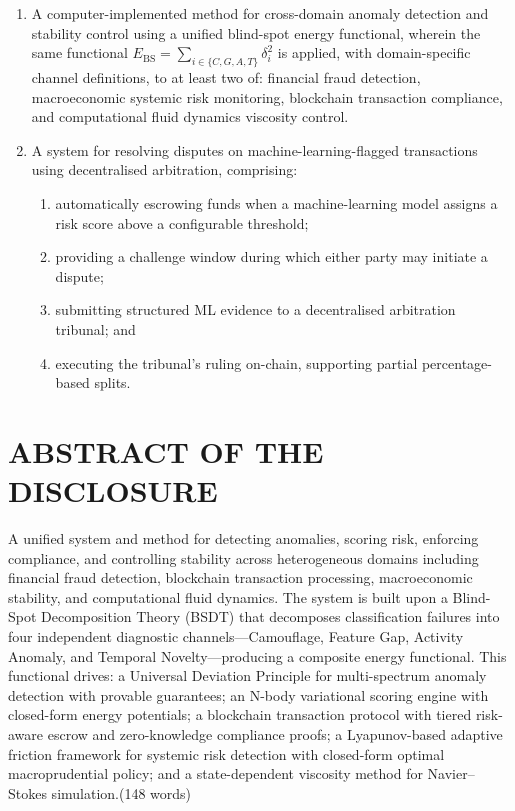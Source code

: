 \documentclass[12pt,a4paper]{article}
\begin{document}
\begin{enumerate}[label=\textbf{\arabic*.}, leftmargin=2em]
\item A computer-implemented method for cross-domain anomaly detection and
stability control using a unified blind-spot energy functional, wherein the
same functional $E_{\mathrm{BS}} = \sum_{i \in \{C,G,A,T\}} \delta_i^2$ is
applied, with domain-specific channel definitions, to at least two of:
financial fraud detection, macroeconomic systemic risk monitoring, blockchain
transaction compliance, and computational fluid dynamics viscosity control.

\item A system for resolving disputes on machine-learning-flagged transactions
using decentralised arbitration, comprising:
\begin{enumerate}[label=(\alph*)]
  \item automatically escrowing funds when a machine-learning model assigns a
    risk score above a configurable threshold;
  \item providing a challenge window during which either party may initiate a
    dispute;
  \item submitting structured ML evidence to a decentralised arbitration
    tribunal; and
  \item executing the tribunal's ruling on-chain, supporting partial
    percentage-based splits.
\end{enumerate}

\end{enumerate}

\newpage

\section*{ABSTRACT OF THE DISCLOSURE}

A unified system and method for detecting anomalies, scoring risk, enforcing
compliance, and controlling stability across heterogeneous domains including
financial fraud detection, blockchain transaction processing, macroeconomic
stability, and computational fluid dynamics.  The system is built upon a
Blind-Spot Decomposition Theory (BSDT) that decomposes classification failures
into four independent diagnostic channels---Camouflage, Feature Gap, Activity
Anomaly, and Temporal Novelty---producing a composite energy functional.  This
functional drives: a Universal Deviation Principle for multi-spectrum anomaly
detection with provable guarantees; an N-body variational scoring engine with
closed-form energy potentials; a blockchain transaction protocol with tiered
risk-aware escrow and zero-knowledge compliance proofs; a Lyapunov-based
adaptive friction framework for systemic risk detection with closed-form
optimal macroprudential policy; and a state-dependent viscosity method for
Navier--Stokes simulation.\quad (148 words)
\end{document}

